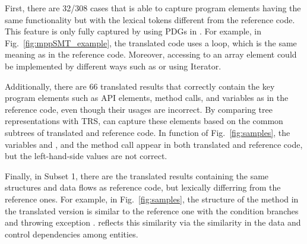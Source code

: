 First, there are 32/308 cases that {\model} is able to capture program
elements having the same functionality but with the lexical tokens
different from the reference code. This feature is only fully captured
by using PDGs in {\model}. For example, in
Fig.~\ref{fig:mppSMT_example}, the translated code uses a 
loop, which is the same meaning as  in the reference
code. Moreover, accessing to an array element could be implemented by
different ways such as  or using Iterator.
%

Additionally, there are 66 translated results that correctly contain
the key program elements such as API elements, method calls, and
variables as in the reference code, even though their usages are
incorrect. By comparing tree representations with TRS, {\model} can
capture these elements based on the common subtrees of translated and
reference code. In function  of
Fig.~\ref{fig:samples}, the variables  and
, and the method call  appear in
both translated and reference code, but the left-hand-side values are
not correct.
%

Finally, in Subset 1, there are the translated results containing the
same structures and data flows as reference code, but lexically
differring from the reference ones. For example, in
Fig.~\ref{fig:samples}, the structure of the method
 in the translated version is similar to the
reference one with the condition branches  and throwing
exception . {\model} reflects this
similarity via the similarity in the data and control dependencies
among entities.




